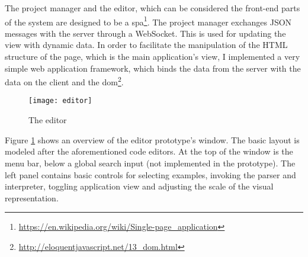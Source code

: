 The project manager and the editor, which can be considered the front-end parts
of the system are designed to be a
\acrlong{spa}\footnote{\url{https://en.wikipedia.org/wiki/Single-page_application}}. The
project manager exchanges JSON messages with the server through a
WebSocket. This is used for updating the view with dynamic data. In order to
facilitate the manipulation of the HTML structure of the page, which is the main
application's view, I implemented a very simple web application framework, which
binds the data from the server with the data on the client and the
\acrlong{dom}\footnote{\url{http://eloquentjavascript.net/13_dom.html}}.

\begin{figure}[h!]
\centering \texttt{[image: editor]}
\caption{The editor}
\label{fig:editor}
\end{figure}

Figure \ref{fig:editor} shows an overview of the editor prototype's window. The
basic layout is modeled after the aforementioned code editors. At the top of the
window is the menu bar, below a global search input (not implemented in the
prototype). The left panel contains basic controls for selecting examples,
invoking the parser and interpreter, toggling application view and adjusting the
scale of the visual representation.

